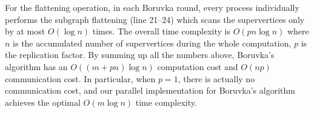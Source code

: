 \documentclass{sokendai_thesis} %
\newcommand{\boruvka}[0]{Boruvka}
\begin{document}
For the flattening operation, in each \boruvka{} round, every process individually performs the subgraph flattening (line 21--24) which scans the supervertices only by at most $O(\log n)$ times.
The overall time complexity is $O(pn\log n)$ where $n$ is the accumulated number of supervertices during the whole computation, $p$ is the replication factor.
By summing up all the numbers above, \boruvka{}'s algorithm has an $O((m+pn)\log n)$ computation cost and $O(np)$ communication cost.
In particular, when $p=1$, there is actually no communication cost, and our parallel implementation for \boruvka{}'s algorithm achieves the optimal $O(m\log n)$ time complexity.

\end{document}
